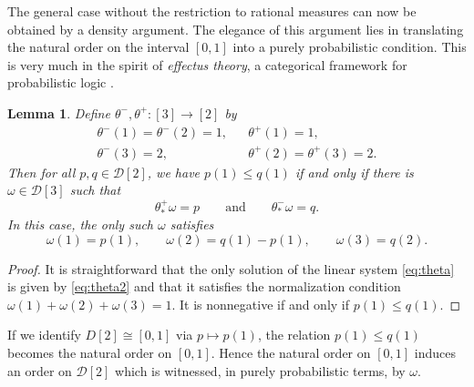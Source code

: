 \documentclass[11pt,a4paper]{scrartcl}
\newcommand{\finiteset}[1]{[#1]}	%
\newcommand{\two}{\finiteset{2}}		%
\newcommand{\three}{\finiteset{3}}		%
\newcommand{\dist}{\mathcal{D}}
\newtheorem{lem}[theo]{Lemma}
\theoremstyle{definition}
\begin{document}
The general case without the restriction to rational measures can now be obtained by a density argument. The elegance of this argument lies in translating the natural order on the interval $[0,1]$ into a purely probabilistic condition. This is very much in the spirit of \emph{effectus theory}, a categorical framework for probabilistic logic \cite{Jacobs2015}.

\begin{lem}\label{prop:order}
  Define $\theta^-,\theta^+: \three \rightarrow \two$ by
  \begin{align*}
	  \theta^-(1) = \theta^-(2) = 1, &&  \theta^+(1) = 1,  \\
	  \theta^-(3) = 2, && \theta^+(2) = \theta^+(3) = 2.
  \end{align*}
  Then for all $p, q \in \dist\two$, we have $p(1) \leq q(1)$ if and only if there is $\omega \in \dist\three$ such that
  \begin{equation}\label{eq:theta}
    \theta^+_\ast\omega = p \qquad \text{and} \qquad \theta^-_\ast\omega = q.
  \end{equation}
  In this case, the only such $\omega$ satisfies
  \begin{equation}
	  \label{eq:theta2}
	  \omega(1) = p(1), \qquad \omega(2) = q(1)-p(1), \qquad \omega(3) = q(2).
  \end{equation}
\end{lem}
\begin{proof}
  It is straightforward that the only solution of the linear system \cref{eq:theta} is given by \cref{eq:theta2} and that it satisfies the normalization condition $\omega(1) + \omega(2) + \omega(3) = 1$.
  It is nonnegative if and only if $p(1) \leq q(1)$.
\end{proof}

If we identify $D\two \cong [0,1]$ via $p \mapsto p(1)$, the relation $p(1) \leq q(1)$ becomes the natural order on $[0,1]$.
Hence  the natural order on $[0,1]$ induces an order on $\dist\two$ which is witnessed, in purely probabilistic terms, by $\omega$.
\end{document}
